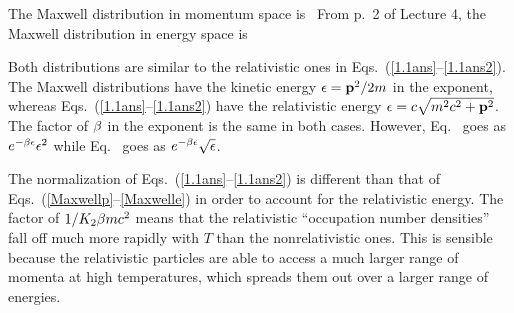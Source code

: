 {	
	The Maxwell distribution in momentum space is~\cite[p.~109]{Landau}
	From p.~2 of Lecture 4, the Maxwell distribution in energy space is
	
	Both distributions are similar to the relativistic ones in Eqs.~(\ref{1.1ans}--\ref{1.1ans2}).  The Maxwell distributions have the kinetic energy $\epsilon = \vb{p}^2 / 2m$ in the exponent, whereas Eqs.~(\ref{1.1ans}--\ref{1.1ans2}) have the relativistic energy $\epsilon = c \sqrt{m^2 c^2 + \vb{p}^2}$.  The factor of $\beta$ in the exponent is the same in both cases.  	However, Eq.~ goes as $e^{-\beta \epsilon} \epsilon^2$ while Eq.~ goes as $e^{-\beta \epsilon} \sqrt{\epsilon}$.
	
	The normalization of Eqs.~(\ref{1.1ans}--\ref{1.1ans2}) is different than that of Eqs.~(\ref{Maxwellp}--\ref{Maxwelle}) in order to account for the relativistic energy.  The factor of $1/K_2{\beta mc^2}$ means that the relativistic ``occupation number densities'' fall off much more rapidly with $T$ than the nonrelativistic ones.  This is sensible because the relativistic particles are able to access a much larger range of momenta at high temperatures, which spreads them out over a larger range of energies.
}

%
%

\clearpage
{}

